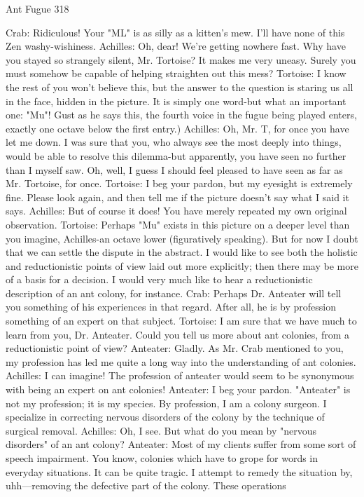 Ant Fugue                                                                               318

Crab: Ridiculous! Your "ML" is as silly as a kitten's mew. I'll have none of this Zen
    washy-wishiness.
Achilles: Oh, dear! We're getting nowhere fast. Why have you stayed so strangely silent,
    Mr. Tortoise? It makes me very uneasy. Surely you must somehow be capable of
    helping straighten out this mess?
Tortoise: I know the rest of you won't believe this, but the answer to the question is
    staring us all in the face, hidden in the picture. It is simply one word-but what an
    important one: "Mu"!
Gust as he says this, the fourth voice in the fugue being played enters, exactly one octave
    below the first entry.)
Achilles: Oh, Mr. T, for once you have let me down. I was sure that you, who always see
    the most deeply into things, would be able to resolve this dilemma-but apparently,
    you have seen no further than I myself saw. Oh, well, I guess I should feel pleased to
    have seen as far as Mr. Tortoise, for once.
Tortoise: I beg your pardon, but my eyesight is extremely fine. Please look again, and
    then tell me if the picture doesn't say what I said it says.
Achilles: But of course it does! You have merely repeated my own original observation.
Tortoise: Perhaps "Mu" exists in this picture on a deeper level than you imagine,
    Achilles-an octave lower (figuratively speaking). But for now I doubt that we can
    settle the dispute in the abstract. I would like to see both the holistic and
    reductionistic points of view laid out more explicitly; then there may be more of a
    basis for a decision. I would very much like to hear a reductionistic description of an
    ant colony, for instance.
Crab: Perhaps Dr. Anteater will tell you something of his experiences in that regard.
    After all, he is by profession something of an expert on that subject.
Tortoise: I am sure that we have much to learn from you, Dr. Anteater. Could you tell us
    more about ant colonies, from a reductionistic point of view?
Anteater: Gladly. As Mr. Crab mentioned to you, my profession has led me quite a long
    way into the understanding of ant colonies.
Achilles: I can imagine! The profession of anteater would seem to be synonymous with
    being an expert on ant colonies!
Anteater: I beg your pardon. "Anteater" is not my profession; it is my species. By
    profession, I am a colony surgeon. I specialize in correcting nervous disorders of the
    colony by the technique of surgical removal.
Achilles: Oh, I see. But what do you mean by "nervous disorders" of an ant colony?
Anteater: Most of my clients suffer from some sort of speech impairment. You know,
    colonies which have to grope for words in everyday situations. It can be quite tragic.
    I attempt to remedy the situation by, uhh—removing the defective part of the colony.
    These operations




